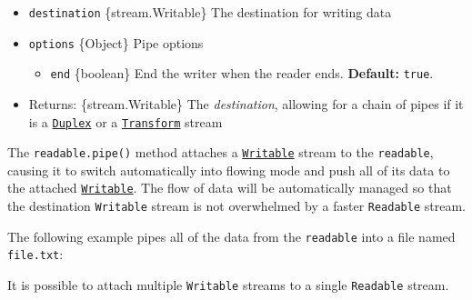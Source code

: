 \begin{itemize}
\tightlist
\item
  \texttt{destination} \{stream.Writable\} The destination for writing
  data
\item
  \texttt{options} \{Object\} Pipe options

  \begin{itemize}
  \tightlist
  \item
    \texttt{end} \{boolean\} End the writer when the reader ends.
    \textbf{Default:} \texttt{true}.
  \end{itemize}
\item
  Returns: \{stream.Writable\} The \emph{destination}, allowing for a
  chain of pipes if it is a
  \hyperref[class-streamduplex]{\texttt{Duplex}} or a
  \hyperref[class-streamtransform]{\texttt{Transform}} stream
\end{itemize}

The \texttt{readable.pipe()} method attaches a
\hyperref[class-streamwritable]{\texttt{Writable}} stream to the
\texttt{readable}, causing it to switch automatically into flowing mode
and push all of its data to the attached
\hyperref[class-streamwritable]{\texttt{Writable}}. The flow of data
will be automatically managed so that the destination \texttt{Writable}
stream is not overwhelmed by a faster \texttt{Readable} stream.

The following example pipes all of the data from the \texttt{readable}
into a file named \texttt{file.txt}:

\begin{Shaded}
\begin{Highlighting}[]
\OperatorTok{=} \NormalTok{(}\NormalTok{)}\OperatorTok{;}
\OperatorTok{=} \NormalTok{()}\OperatorTok{;}
\OperatorTok{=}\NormalTok{(}\NormalTok{)}\OperatorTok{;}
\OperatorTok{;}
\end{Highlighting}
\end{Shaded}

It is possible to attach multiple \texttt{Writable} streams to a single
\texttt{Readable} stream.

